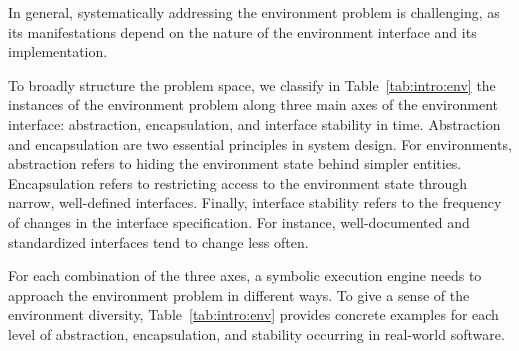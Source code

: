 In general, systematically addressing the environment problem is challenging, as its manifestations depend on the nature of the environment interface and its implementation.

To broadly structure the problem space, we classify in Table~\ref{tab:intro:env} the instances of the environment problem along three main axes of the environment interface: abstraction, encapsulation, and interface stability in time.
%
Abstraction and encapsulation are two essential principles in system design.  For environments, abstraction refers to hiding the environment state behind simpler entities.
%
Encapsulation refers to restricting access to the environment state through narrow, well-defined interfaces.
%
Finally, interface stability refers to the frequency of changes in the interface specification.  For instance, well-documented and standardized interfaces tend to change less often.

For each combination of the three axes, a symbolic execution engine needs to approach the environment problem in different ways.
%
To give a sense of the environment diversity, Table~\ref{tab:intro:env} provides concrete examples for each level of abstraction, encapsulation, and stability occurring in real-world software.


